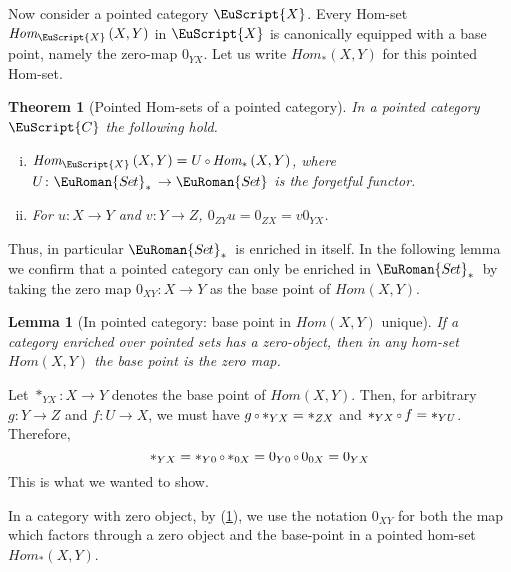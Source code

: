 \documentclass [12pt,oneside]{book}%
\makeatletter
\theoremstyle{captionstyle}  %
\newtheorem{theorem}[subsection]{Theorem}
\newtheorem{lemma}[theorem]{Lemma}
\renewenvironment{proof}[1][\proofname]{\vspace{-2ex}\par       %
	\pushQED{\qed}%
	\normalfont \topsep6\p@\@plus6\p@\relax
	\trivlist
	\item[\hskip\labelsep
	            \color{proofcaption}\bfseries                %
	            #1\@addpunct{\quad}]\ignorespaces
}{%
	\popQED\endtrivlist\@endpefalse
}
\newcommand{\from}{\colon}				%
\newcommand{\Comp}{\raisebox{0.1ex}{\ensuremath{\,\scriptstyle{\circ}}\,}}
\newcommand{\Hom}[2]{\textit{Hom}\left(#1,#2\right)}
\newcommand{\HomIn}[3]{\textit{Hom}_{#1}\left(#2,#3\right)}
\newcommand{\HomBsd}[2]{\textit{Hom}_{\ast}\left(#1,#2\right)}      %
\newcommand{\Sets}{\EuRoman{S{\kern-0.12ex}e{\hskip-0.14ex}t}}			                       %
\newcommand{\SetsBsd}{\EuRoman{S{\kern-0.12ex}e{\hskip-0.14ex}t}_{\ast}\,}	%
\newcommand{\ZeroMap}{0}                                %
\newcommand{\Ctgry}[1]{\EuScript{#1}}					%
\makeatother
\begin{document}
Now consider a pointed category $\Ctgry{X}$. Every Hom-set $\HomIn{\Ctgry{X}}{X}{Y}$ in $\Ctgry{X}$ is canonically equipped with a base point, namely the zero-map $\ZeroMap_{YX}$. Let us write $\HomBsd{X}{Y}$ for this pointed Hom-set.

\begin{theorem}[Pointed Hom-sets of a pointed category]
    \label{thm:PointedCat-EnrichedInSet_*-Light}
    In a pointed category $\Ctgry{C}$ the following hold.
    \begin{enumerate}[(i)]
        \item $\HomIn{\Ctgry{X}}{X}{Y}=U\Comp \HomBsd{X}{Y}$, where $U\from \SetsBsd\to \Sets$ is the forgetful functor.
        \item For $u\from X\to Y$ and $v\from Y\to Z$, $\ZeroMap_{ZY}u = \ZeroMap_{ZX} = v\ZeroMap_{YX}$.
    \end{enumerate}
\end{theorem}

Thus, in particular $\SetsBsd$ is enriched in itself. In the following lemma we confirm that a pointed category can only be enriched in $\SetsBsd$ by taking the zero map $\ZeroMap_{XY}\from X\to Y$ as the base point of $\Hom{X}{Y}$.

\begin{lemma}[In pointed category: base point in $\Hom{X}{Y}$ unique]
    \label{thm:PointedCat-UniqueBasePointIn-Hom(X,Y)}
    If a category enriched over pointed sets has a zero-object, then in any hom-set $\Hom{X}{Y}$ the base point is the zero map.
\end{lemma}
\begin{proof}
    Let $\ast_{YX}\from X\to Y$ denotes the base point of $\Hom{X}{Y}$. Then, for arbitrary ${g\from Y\to Z}$ and $f\from U\to X$, we must have $g\Comp \ast_{YX}=\ast_{ZX}$ and $\ast_{YX}\Comp f=\ast_{YU}$. Therefore,
    \begin{equation*}
        \ast_{YX} = \ast_{Y0}\Comp \ast_{0X}=\ZeroMap_{Y0}\Comp 0_{0X} = \ZeroMap_{YX}
    \end{equation*}
    This is what we wanted to show.
\end{proof}

In a category with zero object, by (\ref{thm:PointedCat-UniqueBasePointIn-Hom(X,Y)}), we use the notation $0_{XY}$ for both the map which factors through a zero object and the base-point in a pointed hom-set $\HomBsd{X}{Y}$.
\end{document}
